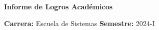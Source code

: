 \def\docente{Velasteguí Izurieta Homero Javier}
\def\escuela{Escuela de Sistemas}
\def\asignatura{Redes Inteligentes}
\def\semestre{2024-I}
\def\escenario{Laboratorio}
\def\numguia{1}
\def\tema{Tema de la Práctica}
\def\horaspractica{4}
\def\horasasignatura{48}



\def\titulo{\textbf{Informe de Logros Académicos}}

\begin{center}
\Large\titulo     
\end{center}
\Large {\textbf{Carrera:} \escuela \hspace{3cm} \textbf{Semestre:}  \semestre}

\vspace{10mm}
\renewcommand{\arraystretch}{1.5}
\noindent
